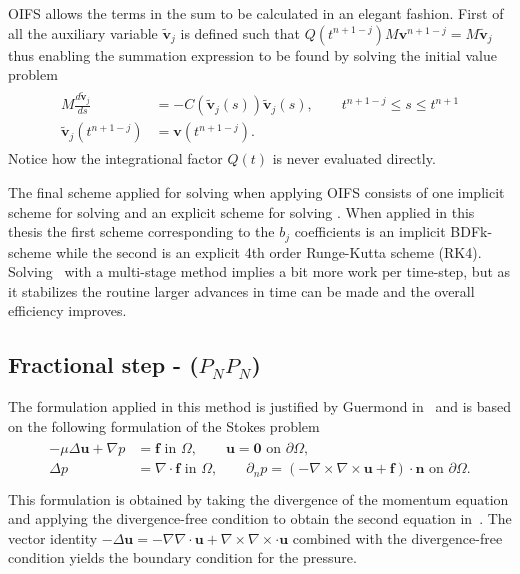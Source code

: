 OIFS allows the terms in the sum to be calculated in an elegant fashion.
First of all the auxiliary variable $\tilde{\mathbf{v}}_j$ is defined such that $Q(t^{n+1-j})M\mathbf{v}^{n+1-j} = M\tilde{\mathbf{v}}_j$
thus enabling the summation expression to be found by solving the initial value problem 
\begin{align}
    \begin{split}
    M\frac{d\tilde{\mathbf{v}}_j}{ds} &= -C(\tilde{\mathbf{v}}_j(s))\tilde{\mathbf{v}}_j(s) , \qquad t^{n+1-j}\leq s\leq t^{n+1}\\
    \tilde{\mathbf{v}}_j(t^{n+1-j}) &= \mathbf{v}(t^{n+1-j}).
    \end{split}
    \label{eq:IVP}
\end{align}
Notice how the integrational factor $Q(t)$ is never evaluated directly.

The final scheme applied for solving  when applying OIFS consists of one implicit scheme for 
solving  and an explicit scheme for solving . When applied in this thesis the 
first scheme corresponding to the $b_j$ coefficients is an implicit BDFk-scheme while the second is an explicit 4th order Runge-Kutta scheme (RK4). 
Solving~ with a multi-stage method implies a bit more work per time-step, but as it stabilizes the routine larger advances in 
time can be made and the overall efficiency improves.



\subsection{Fractional step - ($P_NP_N$)} \label{fracstep}
The formulation applied in this method is justified by Guermond in~\cite{GuermondPnPn} and is 
based on the following formulation of the Stokes problem 
%
\begin{align}
    \begin{split}
        - \mu \Delta \mathbf{u} + \nabla p &= \mathbf{f} \text{  in  } \Omega,
        \qquad \mathbf{u} = \mathbf{0} \text{  on  } \partial \Omega,\\
        \Delta p &= \nabla \cdot \mathbf{f}\text{  in  } \Omega,\qquad \partial_n p
        = (-\nabla \times \nabla \times \mathbf{u} + \mathbf{f} ) \cdot \mathbf{n} \text{  on  } \partial \Omega. \\
    \end{split}
    \label{eq:nonstandardstokes}
\end{align}
%
This formulation is obtained by taking the divergence of the momentum equation and applying the 
divergence-free condition to obtain the second equation in~.
The vector identity 
$ -\Delta \mathbf{u}=-\nabla\nabla\cdot\mathbf{u}+\nabla\times\nabla\times\cdot\mathbf{u}$ 
combined with the divergence-free condition yields the boundary condition for the pressure.

